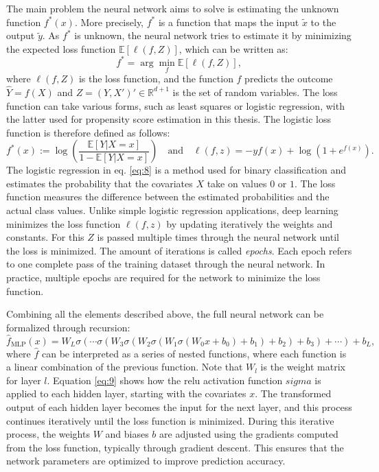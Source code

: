 The main problem the neural network aims to solve is estimating the unknown function $f^*(x)$.
More precisely, $f^*$ is a function that maps the input $\tilde{x}$ to the output $\tilde{y}$.
As $f^*$ is unknown, the neural network tries to estimate it by minimizing the expected loss function $\mathbb{E}[\ell(f, Z)]$, which can be written as:
\begin{equation}
f^* = \arg \min_f \mathbb{E}[\ell(f, Z)],
\end{equation}
where $\ell(f, Z)$ is the loss function, and the function $f$ predicts the outcome $\hat{Y} = f(X)$ and $Z = (Y, X')' \in \mathbb{R}^{d+1}$ is the set of random variables.
The loss function can take various forms, such as least squares or logistic regression, with the latter used for propensity score estimation in this thesis.
The logistic loss function is therefore defined as follows:
\begin{equation}
f^*(x) := \log \left( \frac{\mathbb{E}[Y|X = x]}{1 - \mathbb{E}[Y|X = x]} \right) \quad \text{and} \quad \ell(f, z) = -yf(x) + \log(1 + e^{f(x)}).
\label{eq:8}
\end{equation}
The logistic regression in eq. \ref*{eq:8} is a method used for binary classification and estimates the probability that the covariates $X$ take on values $0$ or $1$.
The loss function measures the difference between the estimated probabilities and the actual class values.
Unlike simple logistic regression applications, deep learning minimizes the loss function $\ell(f, z)$ by updating iteratively the weights and constants.
For this $Z$ is passed multiple times through the neural network until the loss is minimized.
The amount of iterations is called \textit{epochs}.
Each epoch refers to one complete pass of the training dataset through the neural network.
In practice, multiple epochs are required for the network to minimize the loss function.

Combining all the elements described above, the full neural network can be formalized through recursion:
\begin{equation}
\hat{f}_{\text{MLP}}(x) = W_L \sigma \left( \cdots \sigma \left( W_3 \sigma \left( W_2 \sigma \left( W_1 \sigma \left( W_0 x + b_0 \right) + b_1 \right) + b_2 \right) + b_3 \right) + \cdots \right) + b_L,
\label{eq:9}
\end{equation}
where $\hat{f}$ can be interpreted as a series of nested functions, where each function is a linear combination of the previous function.
Note that $W_l$ is the weight matrix for layer $l$.
Equation \ref{eq:9} shows how the \ac{relu} activation function $sigma$ is applied to each hidden layer, starting with the covariates $x$.
The transformed output of each hidden layer becomes the input for the next layer, and this process continues iteratively until the loss function is minimized.
During this iterative process, the weights $W$ and biases $b$ are adjusted using the gradients computed from the loss function, typically through gradient descent.
This ensures that the network parameters are optimized to improve prediction accuracy.

